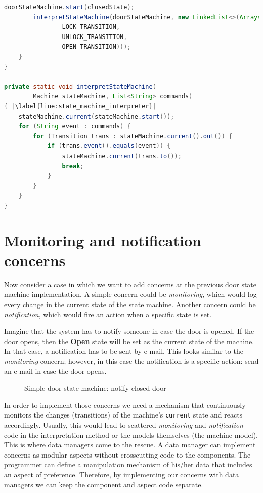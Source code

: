 \begin{sourcecode}
\begin{lstlisting}[language=Java, escapechar=|]
		doorStateMachine.start(closedState);
		interpretStateMachine(doorStateMachine, new LinkedList<>(Arrays.asList(
		        LOCK_TRANSITION,
		        UNLOCK_TRANSITION,
		        OPEN_TRANSITION)));
	}
}

private static void interpretStateMachine(
		Machine stateMachine, List<String> commands) 
{ |\label{line:state_machine_interpreter}|
    stateMachine.current(stateMachine.start());
    for (String event : commands) {
        for (Transition trans : stateMachine.current().out()) {
            if (trans.event().equals(event)) {
                stateMachine.current(trans.to());
                break;
            }
        }
    }
}   
	\end{lstlisting}
	\caption{Door state machine}
	\label{lst:Door_state_machine}
\end{sourcecode}

\section{Monitoring and notification concerns}
Now consider a case in which we want to add concerns at the previous door state machine implementation.
A simple concern could be \textit{monitoring}, which would log every change in the current state of the state machine.
Another concern could be \textit{notification}, which would fire an action when a specific state is set.

Imagine that the system has to notify someone in case the door is opened.
If the door opens, then the \textbf{Open} state will be set as the current state of the machine.
In that case, a notification has to be sent by e-mail.
This looks similar to the \textit{monitoring} concern; however, in this case the notification is a specific action: send an e-mail in case the door opens.

\begin{figure}[H]
	\centering
  	\caption{Simple door state machine: notify closed door}
  	\label{fig:State_machine_danger}
\end{figure}

In order to implement those concerns we need a mechanism that continuously monitors the changes (transitions) of the machine's \texttt{current} state and reacts accordingly.
Usually, this would lead to scattered \textit{monitoring} and \textit{notification} code in the interpretation method or the models themselves (the machine model).
This is where data managers come to the rescue.
A data manager can implement concerns as modular aspects without crosscutting code to the components.
The programmer can define a manipulation mechanism of his/her data that includes an aspect of preference.
Therefore, by implementing our concerns with data managers we can keep the component and aspect code separate.

